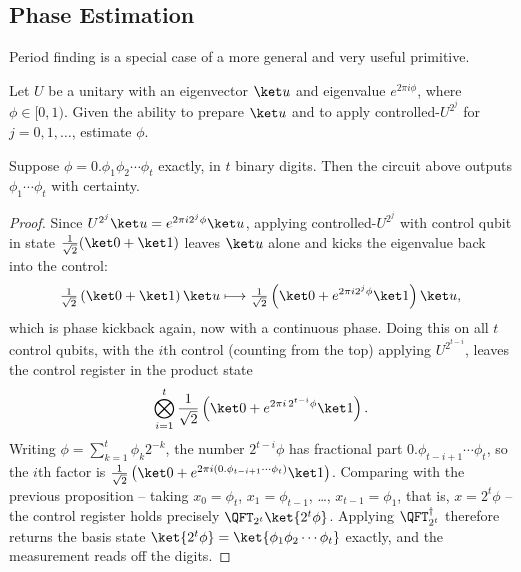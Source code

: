 \subsection{Phase Estimation}

Period finding is a special case of a more general and very useful primitive.

\begin{problem*}
	Let $U$ be a unitary with an eigenvector $\ket u$ and eigenvalue $e^{2\pi i\phi}$, where $\phi\in[0,1)$. Given the ability to prepare $\ket u$ and to apply controlled-$U^{2^j}$ for $j=0,1,\dots$, estimate $\phi$.
\end{problem*}

\begin{center}
\end{center}

\begin{proposition}
	Suppose $\phi = 0.\phi_1\phi_2\cdots\phi_t$ exactly, in $t$ binary digits. Then the circuit above outputs $\phi_1\cdots\phi_t$ with certainty.
\end{proposition}

\begin{proof}
	Since $U^{2^j}\ket u = e^{2\pi i2^j\phi}\ket u$, applying controlled-$U^{2^j}$ with control qubit in state $\tfrac1{\sqrt2}(\ket0+\ket1)$ leaves $\ket u$ alone and kicks the eigenvalue back into the control:
	$$\tfrac1{\sqrt2}\left(\ket0+\ket1\right)\ket u\longmapsto\tfrac1{\sqrt2}\left(\ket0+e^{2\pi i2^j\phi}\ket1\right)\ket u,$$
	which is phase kickback again, now with a continuous phase. Doing this on all $t$ control qubits, with the $i$th control (counting from the top) applying $U^{2^{t-i}}$, leaves the control register in the product state
	$$\bigotimes_{i=1}^{t}\frac{1}{\sqrt2}\left(\ket0+e^{2\pi i\,2^{t-i}\phi}\ket1\right).$$
	Writing $\phi = \sum_{k=1}^t\phi_k2^{-k}$, the number $2^{t-i}\phi$ has fractional part $0.\phi_{t-i+1}\cdots\phi_t$, so the $i$th factor is $\tfrac1{\sqrt2}\left(\ket0+e^{2\pi i(0.\phi_{t-i+1}\cdots\phi_t)}\ket1\right)$. Comparing with the previous proposition -- taking $x_0 = \phi_t$, $x_1 = \phi_{t-1}$, \dots, $x_{t-1} = \phi_1$, that is, $x = 2^t\phi$ -- the control register holds precisely $\QFT_{2^t}\ket{2^t\phi}$. Applying $\QFT_{2^t}^\dagger$ therefore returns the basis state $\ket{2^t\phi} = \ket{\phi_1\phi_2\cdots\phi_t}$ exactly, and the measurement reads off the digits.
\end{proof}

